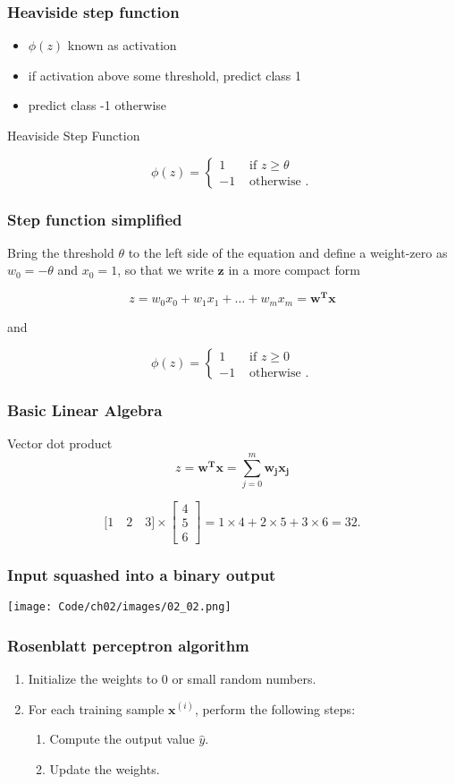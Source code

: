 \documentclass{beamer}
\begin{document}
\begin{frame}
  \frametitle{Heaviside step function}
  \begin{itemize}
  \item $\phi(z)$ known as activation
  \item if activation above some threshold, predict class 1
  \item predict class -1 otherwise
  \end{itemize}
  Heaviside Step Function

  \[ \phi(z) = \begin{cases} 
    1  & \text{ if } z \ge \theta \\
    -1 & \text{ otherwise }.
  \end{cases}
  \]
\end{frame}

\begin{frame}
\frametitle{Step function simplified}
Bring the threshold $\theta$ to the left side of the equation and define a weight-zero as $w_0 = -\theta$ and $x_0=1$, so that we write $\mathbf{z}$ in a more compact form

\[
z  = w_0 x_0 + w_1 x_1 + \dots + w_m x_m = \mathbf{w^T x}
\]

and

\[ \phi(z) = \begin{cases} 
      1  & \text{ if } z \ge 0 \\
      -1 & \text{ otherwise }.
   \end{cases}
\]
\end{frame}

\begin{frame}
  \frametitle{Basic Linear Algebra}
  Vector dot product
  \[
  z  = \mathbf{w^T x} = \sum_{j=0}^{m} \mathbf{w_j} \mathbf{x_j}
  \]

  \[
  \big[1 \quad 2 \quad 3 \big] \times \begin{bmatrix}
    4  \\
    5  \\
    6
  \end{bmatrix} = 1 \times 4 + 2 \times 5 + 3 \times 6 = 32.
  \]
\end{frame}

\begin{frame}
  \frametitle{Input squashed into a binary output}
  \texttt{[image: Code/ch02/images/02\_02.png]} 
\end{frame}

\begin{frame}
  \frametitle{Rosenblatt perceptron algorithm}
  \begin{enumerate}  
  \item Initialize the weights to 0 or small random numbers.
  \item For each training sample $\mathbf{x}^{(i)}$, perform the following steps:
    \begin{enumerate}  
    \item Compute the output value $\hat{y}$.
    \item Update the weights.
    \end{enumerate}
  \end{enumerate}
\end{frame}
\end{document}
